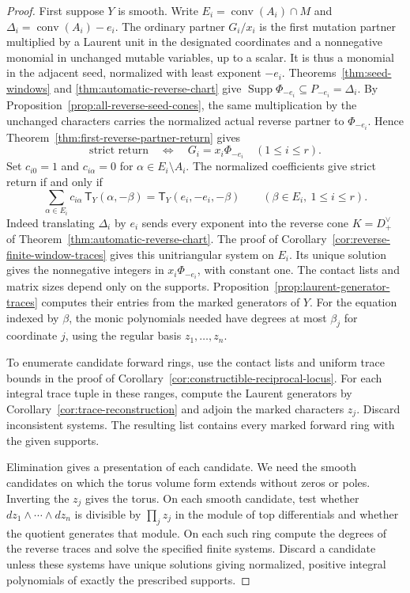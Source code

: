 \documentclass[11pt,reqno]{amsart}
\numberwithin{equation}{section}
\theoremstyle{definition}
\theoremstyle{remark}
\DeclareMathOperator{\Supp}{Supp}
\begin{document}
\begin{proof}
First suppose \(Y\) is smooth. Write
\(E_i=\operatorname{conv}(A_i)\cap M\) and
\(\Delta_i=\operatorname{conv}(A_i)-e_i\). The ordinary partner
\(G_i/x_i\) is the first mutation partner multiplied by a Laurent
unit in the designated coordinates and a nonnegative monomial in
unchanged mutable variables, up to a scalar. It is thus a monomial
in the adjacent seed, normalized with least exponent \(-e_i\).
Theorems~\ref{thm:seed-windows} and
\ref{thm:automatic-reverse-chart} give
\(\Supp\Phi_{-e_i}\subseteq P_{-e_i}=\Delta_i\).
By Proposition~\ref{prop:all-reverse-seed-cones}, the same
multiplication by the unchanged characters carries the normalized
actual reverse partner to \(\Phi_{-e_i}\). Hence
Theorem~\ref{thm:first-reverse-partner-return} gives
\[ \text{strict return}\quad\Longleftrightarrow\quad G_i=x_i\Phi_{-e_i}\quad(1\le i\le r). \]
Set \(c_{i0}=1\) and \(c_{i\alpha}=0\) for \(\alpha\in E_i\setminus A_i\).
The normalized coefficients give strict return if and only if
\[ \sum_{\alpha\in E_i}c_{i\alpha}\,\mathsf T_Y(\alpha,-\beta) =\mathsf T_Y(e_i,-e_i,-\beta) \qquad (\beta\in E_i,\ 1\le i\le r). \]
Indeed translating \(\Delta_i\) by \(e_i\) sends every exponent into
the reverse cone \(K=D_+^\vee\) of Theorem~\ref{thm:automatic-reverse-chart}.
The proof of Corollary~\ref{cor:reverse-finite-window-traces}
gives this unitriangular system on \(E_i\). Its unique solution gives
the nonnegative integers in \(x_i\Phi_{-e_i}\), with constant one.
The contact lists and matrix sizes depend only on the supports.
Proposition~\ref{prop:laurent-generator-traces} computes their entries
from the marked generators of \(Y\). For the equation indexed by \(\beta\), the monic
polynomials needed have degrees at most \(\beta_j\) for coordinate \(j\),
using the regular basis \(z_1,\ldots,z_n\).

To enumerate candidate forward rings, use the contact lists and
uniform trace bounds in the proof of
Corollary~\ref{cor:constructible-reciprocal-locus}. For each integral
trace tuple in these ranges, compute the Laurent generators by
Corollary~\ref{cor:trace-reconstruction} and adjoin the marked
characters \(z_j\). Discard inconsistent systems. The resulting
list contains every marked forward ring with the given supports.

Elimination gives a presentation of each candidate. We need the
smooth candidates on which the torus volume form extends without
zeros or poles. Inverting the \(z_j\) gives the torus. On each smooth
candidate, test whether
\(dz_1\wedge\cdots\wedge dz_n\) is divisible by \(\prod_j z_j\)
in the module of top differentials and whether the quotient generates
that module. On each such ring compute the degrees of the reverse traces
and solve the specified finite systems. Discard a candidate unless
these systems have unique solutions giving normalized, positive
integral polynomials of exactly the prescribed supports.


\end{proof}
\end{document}
